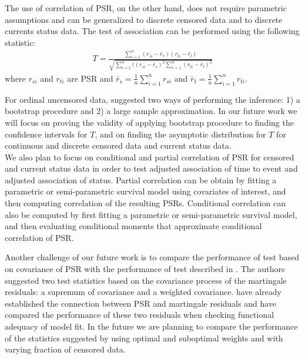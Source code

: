 \documentclass[]{article}
\begin{document}
The use of correlation of PSR, on the other hand, does not require parametric assumptions and can be generalized to discrete censored data and to discrete currents status data. The test of association can be performed using the following statistic:
$$
\begin{aligned}
	T = \frac{\sum_{i=1}^{n} (r_{si} - \bar{r}_s)(r_{ti} - \bar{r}_t)}{\sqrt{\sum_{i=1}^{n} ((r_{si} - \bar{r}_s)^2\sum_{i=1}^{n} (r_{ti} - \bar{r}_t)^2}}
\end{aligned}
$$
where $r_{si}$ and $r_{ti}$ are PSR and $\bar{r}_s = \frac{1}{n}\sum_{i=1}^{n} r_{si}$ and $\bar{r}_t = \frac{1}{n}\sum_{i=1}^{n} r_{ti}$.

For ordinal uncensored data, \cite{li2010test} suggested two ways of performing the inference: 1) a bootstrap procedure and 2) a large sample approximation. In our future work we will focus on proving the validity of applying bootstrap procedure to finding the confidence intervals for $T$, and on finding the asymptotic distribution for $T$ for continuous and discrete censored data and current status data.\\

We also plan to focus on conditional and partial correlation of PSR for censored and current status data in order to test adjusted association of time to event and adjusted association of status. Partial correlation can be obtain by fitting a parametric or semi-parametric survival model using covariates of interest, and then computing correlation of the resulting PSRs. Conditional correlation can also be computed by first fitting a parametric or semi-parametric survival model, and then evaluating conditional moments that approximate conditional correlation of PSR.

Another challenge of our future work is to compare the performance of test based on covariance of PSR with the performance of test described in \cite{shih1996tests}. The authors suggested two test statistics based on the covariance process of the martingale residuals: a supremum of covariance and a weighted covariance. \cite{shepherd2016probability} have already established the connection between PSR and martingale residuals and have compared the performance of these two residuals when checking functional adequacy of model fit. In the future we are planning to compare the performance of the statistics suggested by \cite{shih1996tests} using optimal and suboptimal weights and with varying fraction of censored data.
\end{document}
